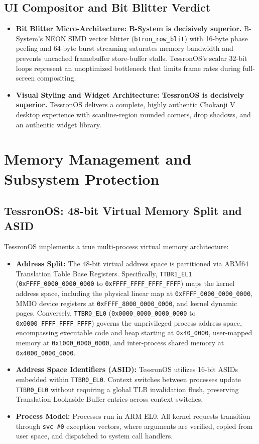 \documentclass[10pt,journal,compsoc,twocolumn]{article}
\begin{document}
\subsection{UI Compositor and Bit Blitter Verdict}
\begin{itemize}[leftmargin=*]
    \item \textbf{Bit Blitter Micro-Architecture: B-System is decisively superior.} B-System's NEON SIMD vector blitter (\texttt{btron\_row\_blit}) with 16-byte phase peeling and 64-byte burst streaming saturates memory bandwidth and prevents uncached framebuffer store-buffer stalls. TessronOS's scalar 32-bit loops represent an unoptimized bottleneck that limits frame rates during full-screen compositing.
    \item \textbf{Visual Styling and Widget Architecture: TessronOS is decisively superior.} TessronOS delivers a complete, highly authentic Chokanji V desktop experience with scanline-region rounded corners, drop shadows, and an authentic widget library.
\end{itemize}

\section{Memory Management and Subsystem Protection}
\label{sec:mmu}

\subsection{TessronOS: 48-bit Virtual Memory Split and ASID}
TessronOS implements a true multi-process virtual memory architecture:
\begin{itemize}[leftmargin=*]
    \item \textbf{Address Split:} The 48-bit virtual address space is partitioned via ARM64 Translation Table Base Registers. Specifically, \texttt{TTBR1\_EL1} (\texttt{0xFFFF\_0000\_0000\_0000} to \texttt{0xFFFF\_FFFF\_FFFF\_FFFF}) maps the kernel address space, including the physical linear map at \texttt{0xFFFF\_0000\_0000\_0000}, MMIO device registers at \texttt{0xFFFF\_8000\_0000\_0000}, and kernel dynamic pages. Conversely, \texttt{TTBR0\_EL0} (\texttt{0x0000\_0000\_0000\_0000} to \texttt{0x0000\_FFFF\_FFFF\_FFFF}) governs the unprivileged process address space, encompassing executable code and heap starting at \texttt{0x40\_0000}, user-mapped memory at \texttt{0x1000\_0000\_0000}, and inter-process shared memory at \texttt{0x4000\_0000\_0000}.
    \item \textbf{Address Space Identifiers (ASID):} TessronOS utilizes 16-bit ASIDs embedded within \texttt{TTBR0\_EL0}. Context switches between processes update \texttt{TTBR0\_EL0} without requiring a global TLB invalidation flush, preserving Translation Lookaside Buffer entries across context switches.
    \item \textbf{Process Model:} Processes run in ARM EL0. All kernel requests transition through \texttt{svc \#0} exception vectors, where arguments are verified, copied from user space, and dispatched to system call handlers.
\end{itemize}
\end{document}
